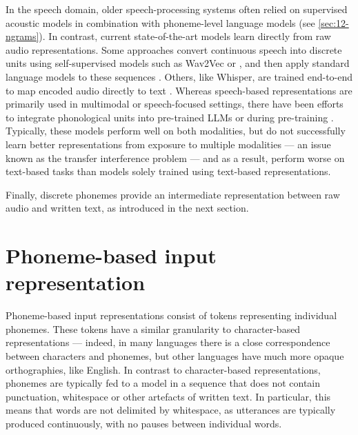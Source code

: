 In the speech domain, older speech-processing systems often relied on supervised acoustic models in combination with phoneme-level language models (see \cref{sec:12-ngrams}). In contrast, current state-of-the-art models learn directly from raw audio representations. Some approaches convert continuous speech into discrete units using self-supervised models such as Wav2Vec \citep{baevski2020wav2vec} or  \citep{hsu-2021-hubert}, and then apply standard language models to these sequences \citep{lakhotia2021generative}. Others, like Whisper, are trained end-to-end to map encoded audio directly to text \citep{radford2023robust}. Whereas speech-based representations are primarily used in multimodal or speech-focused settings, there have been efforts to integrate phonological units into pre-trained LLMs \citep{nguyen-etal-2025-spirit} or during pre-training \citep{bapna2021slam}. Typically, these models perform well on both modalities, but do not successfully learn better representations from exposure to multiple modalities --- an issue known as the transfer interference problem \citep{arivazhagan2019massively} --- and as a result, perform worse on text-based tasks than models solely trained using text-based representations. 

Finally, discrete phonemes provide an intermediate representation between raw audio and written text, as introduced in the next section. %


\section{Phoneme-based input representation}\label{sec:12-phonemic}

Phoneme-based input representations consist of tokens representing individual phonemes. These tokens have a similar granularity to character-based representations --- indeed, in many languages there is a close correspondence between characters and phonemes, but other languages have much more opaque orthographies, like English. In contrast to character-based representations, phonemes are typically fed to a model in a sequence that does not contain punctuation, whitespace or other artefacts of written text. In particular, this means that words are not delimited by whitespace, as utterances are typically produced continuously, with no pauses between individual words.


